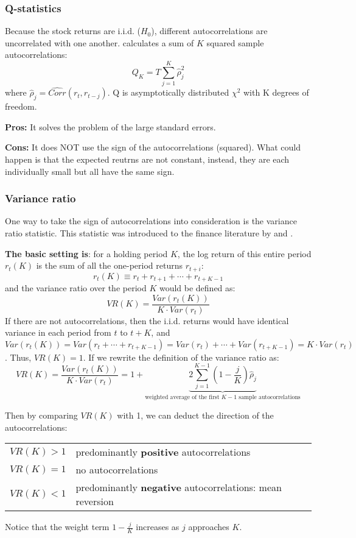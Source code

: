 \subsubsection{Q-statistics}
Because the stock returns are i.i.d. ($H_0$), different autocorrelations are uncorrelated with one another.
\citet{box1970distribution} calculates a sum of $K$ squared sample autocorrelations:
\begin{equation}
    Q_K = T\sum^K_{j=1}\hat{\rho}^2_j
\end{equation}
where $\hat{\rho}_j=\hat{Corr}(r_t,r_{t-j})$. Q is asymptotically distributed $\chi^2$ with K degrees of freedom.

\textbf{Pros:} It solves the problem of the large standard errors.

\textbf{Cons:} It does NOT use the sign of the autocorrelations (squared). What could happen is that the expected reutrns are
not constant, instead, they are each individually small but all have the same sign.

\subsubsection{Variance ratio}
One way to take the sign of autocorrelations into consideration is the variance ratio statistic.
This statistic was introduced to the finance literature by \citet{lo1988stock} and \citet{poterba1988mean}.

\textbf{The basic setting is}: for a holding period $K$, the log return of this entire period $r_t(K)$ is the sum of all the one-period returns $r_{t+i}$:
$$
r_t(K) \equiv r_t + r_{t+1} + \cdots + r_{t+K-1}
$$
and the variance ratio over the period $K$ would be defined as:
$$
    VR(K) = \frac{Var(r_t(K))}{K\cdot Var(r_{t})}
$$
If there are not autocorrelations, then the i.i.d. returns would have identical variance in each period from $t$ to $t+K$,
and $Var(r_t(K)) = Var(r_t+\cdots+r_{t+K-1})=Var(r_t)+\cdots+Var(r_{t+K-1})=K\cdot Var(r_t)$. Thus, $VR(K)=1$. If we rewrite
the definition of the variance ratio as:
\begin{equation}
    VR(K) = \frac{Var(r_t(K))}{K\cdot Var(r_{t})} = 1+\underbrace{2\sum^{K-1}_{j=1}\left(1-\frac{j}{K}\right)\hat{\rho}_j}_{\text{weighted average of the first $K-1$ sample autocorrelations}}
\end{equation}

Then by comparing $VR(K)$ with 1, we can deduct the direction of the autocorrelations:
\begin{center}
    \begin{tabular}{rl}
    \hline
    $VR(K) > 1$ & predominantly \textbf{positive} autocorrelations  \\ 
    $VR(K) = 1$ & no autocorrelations \\ 
    $VR(K) < 1$ & predominantly \textbf{negative} autocorrelations: mean reversion \\
    \hline
    \end{tabular}
\end{center}
Notice that the weight term $1-\frac{j}{K}$ increases as $j$ approaches $K$.

